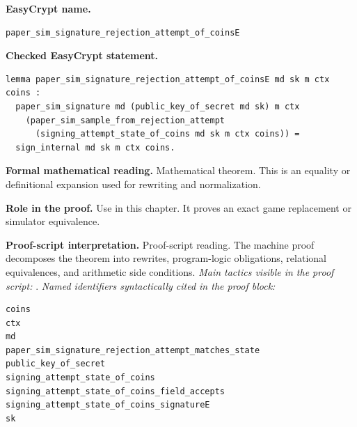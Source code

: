 \begin{formaltheorem}
\noindent\textbf{EasyCrypt name.}
\begin{lstlisting}[language=EasyCrypt,basicstyle=\ttfamily\scriptsize]
paper_sim_signature_rejection_attempt_of_coinsE
\end{lstlisting}
\noindent\textbf{Checked EasyCrypt statement.}
\begin{lstlisting}[language=EasyCrypt,basicstyle=\ttfamily\scriptsize]
lemma paper_sim_signature_rejection_attempt_of_coinsE md sk m ctx coins :
  paper_sim_signature md (public_key_of_secret md sk) m ctx
    (paper_sim_sample_from_rejection_attempt
      (signing_attempt_state_of_coins md sk m ctx coins)) =
  sign_internal md sk m ctx coins.
\end{lstlisting}
\noindent\textbf{Formal mathematical reading.}
Mathematical theorem. This is an equality or definitional expansion used for rewriting and normalization.

\noindent\textbf{Role in the proof.}
Use in this chapter. It proves an exact game replacement or simulator equivalence.

\noindent\textbf{Proof-script interpretation.}
Proof-script reading. The machine proof decomposes the theorem into rewrites, program-logic obligations, relational equivalences, and arithmetic side conditions.
\emph{Main tactics visible in the proof script:} .
\emph{Named identifiers syntactically cited in the proof block:}
\begin{lstlisting}[language=EasyCrypt,basicstyle=\ttfamily\scriptsize]
coins
ctx
md
paper_sim_signature_rejection_attempt_matches_state
public_key_of_secret
signing_attempt_state_of_coins
signing_attempt_state_of_coins_field_accepts
signing_attempt_state_of_coins_signatureE
sk
\end{lstlisting}

\end{formaltheorem}

